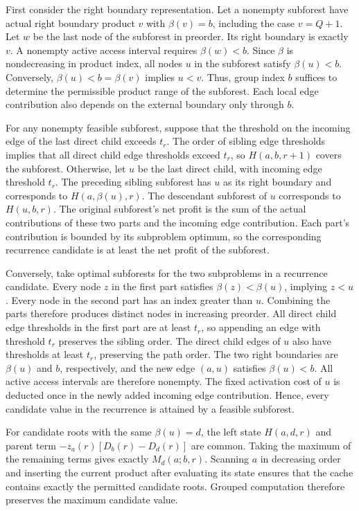 \begin{IEEEproof}
First consider the right boundary representation. Let a nonempty subforest have actual right boundary product $v$ with $\beta(v)=b$, including the case $v=Q+1$. Let $w$ be the last node of the subforest in preorder. Its right boundary is exactly $v$. A nonempty active access interval requires $\beta(w)<b$. Since $\beta$ is nondecreasing in product index, all nodes $u$ in the subforest satisfy $\beta(u)<b$. Conversely, $\beta(u)<b=\beta(v)$ implies $u<v$. Thus, group index $b$ suffices to determine the permissible product range of the subforest. Each local edge contribution also depends on the external boundary only through $b$.

For any nonempty feasible subforest, suppose that the threshold on the incoming edge of the last direct child exceeds $t_r$. The order of sibling edge thresholds implies that all direct child edge thresholds exceed $t_r$, so $H(a,b,r+1)$ covers the subforest. Otherwise, let $u$ be the last direct child, with incoming edge threshold $t_r$. The preceding sibling subforest has $u$ as its right boundary and corresponds to $H(a,\beta(u),r)$. The descendant subforest of $u$ corresponds to $H(u,b,r)$. The original subforest's net profit is the sum of the actual contributions of these two parts and the incoming edge contribution. Each part's contribution is bounded by its subproblem optimum, so the corresponding recurrence candidate is at least the net profit of the subforest.

Conversely, take optimal subforests for the two subproblems in a recurrence candidate. Every node $z$ in the first part satisfies $\beta(z)<\beta(u)$, implying $z<u$. Every node in the second part has an index greater than $u$. Combining the parts therefore produces distinct nodes in increasing preorder. All direct child edge thresholds in the first part are at least $t_r$, so appending an edge with threshold $t_r$ preserves the sibling order. The direct child edges of $u$ also have thresholds at least $t_r$, preserving the path order. The two right boundaries are $\beta(u)$ and $b$, respectively, and the new edge $(a,u)$ satisfies $\beta(u)<b$. All active access intervals are therefore nonempty. The fixed activation cost of $u$ is deducted once in the newly added incoming edge contribution. Hence, every candidate value in the recurrence is attained by a feasible subforest.

For candidate roots with the same $\beta(u)=d$, the left state $H(a,d,r)$ and parent term $-z_a(r)[D_b(r)-D_d(r)]$ are common. Taking the maximum of the remaining terms gives exactly $M_d(a;b,r)$. Scanning $a$ in decreasing order and inserting the current product after evaluating its state ensures that the cache contains exactly the permitted candidate roots. Grouped computation therefore preserves the maximum candidate value.


\end{IEEEproof}
